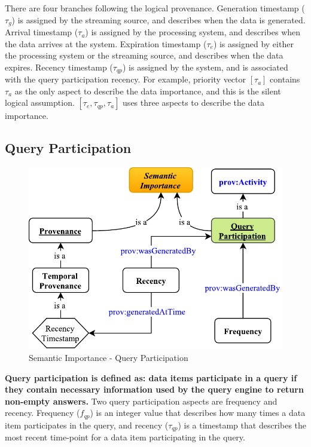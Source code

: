 There are four branches following the logical provenance.
Generation timestamp ($\tau_{g}$) is assigned by the streaming source, and describes when the data is generated.
Arrival timestamp ($\tau_{a}$) is assigned by the processing system, and describes when the data arrives at the system.
Expiration timestamp ($\tau_{e}$) is assigned by either the processing system or the streaming source, and describes when the data expires.
Recency timestamp ($\tau_{qp}$) is assigned by the system, and is associated with the query participation recency.
For example, priority vector $[\tau_{a}]$ contains $\tau_{a}$ as the only aspect to describe the data importance, and this is the silent logical assumption.
$[\tau_{e}, \tau_{qp}, \tau_{a}]$ uses three aspects to describe the data importance. 
%
\subsection{Query Participation}

\begin{figure}[!htbp]
	\centering
    \includegraphics[width=5in]{img/3-siqp.pdf}
    \caption{Semantic Importance - Query Participation}
    \label{fig:3-siqp}
\end{figure}

\textbf{Query participation is defined as: data items participate in a query if they contain necessary information used by the query engine to return non-empty answers.}
Two query participation aspects are frequency and recency.
Frequency ($f_{qp}$) is an integer value that describes how many times a data item participates in the query, 
and recency ($\tau_{qp}$) is a timestamp that describes the most recent time-point for a data item participating in the query.

